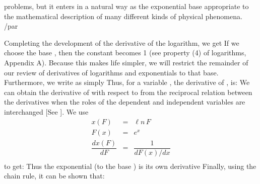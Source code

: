 {{problems, but it enters in a natural way as the exponential base appropriate
to the mathematical description of many different kinds of physical
phenomena.} /par
%
\par{Completing the development of the derivative of the logarithm, we get
%
%
If we choose the base , then the constant  becomes 1 (see
property (4) of logarithms, Appendix A).
Because this makes life simpler, we will restrict the remainder of our
review of derivatives of logarithms and exponentials to that base.
Furthermore, we write  as simply 
Thus, for a variable , the derivative of 
, is:
%
%
We can obtain the derivative of  with respect to  from the
reciprocal relation between the derivatives when the roles of the dependent
and independent variables are interchanged [See ].
We use
%
\begin{eqnarray*}
x(F) & = & \ell n\,F \\
F(x) & = & e^x \\
\dfrac{dx(F)}{dF} & = & \dfrac{1}{dF(x)/dx} \\
\end{eqnarray*}
%
to get:
%
%
Thus the exponential (to the base ) is its own derivative\!
Finally, using the chain rule, it can be shown that:
%
}%
}%
%
